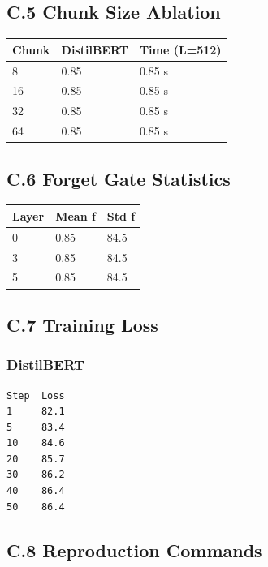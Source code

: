 \subsection{C.5 Chunk Size Ablation}

\begin{table}[H]
\centering
\small
\begin{tabular}{lll}
\toprule
\textbf{Chunk} & \textbf{DistilBERT} & \textbf{Time (L=512)} \\
\midrule
8 & 0.85 & 0.85 s \\
16 & 0.85 & 0.85 s \\
32 & 0.85 & 0.85 s \\
64 & 0.85 & 0.85 s \\
\bottomrule
\end{tabular}
\end{table}

\subsection{C.6 Forget Gate Statistics}

\begin{table}[H]
\centering
\small
\begin{tabular}{lll}
\toprule
\textbf{Layer} & \textbf{Mean f} & \textbf{Std f} \\
\midrule
0 & 0.85 & 84.5 \\
3 & 0.85 & 84.5 \\
5 & 0.85 & 84.5 \\
\bottomrule
\end{tabular}
\end{table}

\subsection{C.7 Training Loss}

\subsubsection{DistilBERT}
\begin{lstlisting}
Step  Loss
1     82.1
5     83.4
10    84.6
20    85.7
30    86.2
40    86.4
50    86.4
\end{lstlisting}

\subsection{C.8 Reproduction Commands}

